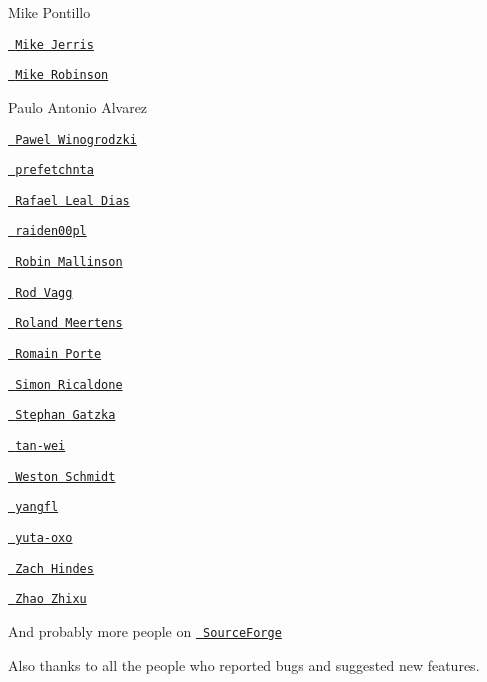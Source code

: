 \begin{DoxyItemize}
\item Mike Pontillo
\item \href{https://github.com/mjerris}{\texttt{ Mike Jerris}}
\item \href{https://github.com/mhrobinson}{\texttt{ Mike Robinson}}
\item Paulo Antonio Alvarez
\item \href{https://github.com/PawelWMS}{\texttt{ Pawel Winogrodzki}}
\item \href{https://github.com/prefetchnta}{\texttt{ prefetchnta}}
\item \href{https://github.com/rafaeldias}{\texttt{ Rafael Leal Dias}}
\item \href{https://github.com/raiden00pl}{\texttt{ raiden00pl}}
\item \href{https://github.com/rmallins}{\texttt{ Robin Mallinson}}
\item \href{https://github.com/rvagg}{\texttt{ Rod Vagg}}
\item \href{https://github.com/rmeertens}{\texttt{ Roland Meertens}}
\item \href{https://github.com/MicroJoe}{\texttt{ Romain Porte}}
\item \href{https://github.com/simon-p-r}{\texttt{ Simon Ricaldone}}
\item \href{https://github.com/gatzka}{\texttt{ Stephan Gatzka}}
\item \href{https://github.com/tan-wei}{\texttt{ tan-\/wei}}
\item \href{https://github.com/schmidtw}{\texttt{ Weston Schmidt}}
\item \href{https://github.com/yangfl}{\texttt{ yangfl}}
\item \href{https://github.com/yuta-oxo}{\texttt{ yuta-\/oxo}}
\item \href{https://github.com/zhindes}{\texttt{ Zach Hindes}}
\item \href{https://github.com/zhaozhixu}{\texttt{ Zhao Zhixu}}
\end{DoxyItemize}

And probably more people on \href{https://sourceforge.net/p/cjson/bugs/search/?q=status\%3Aclosed-rejected+or+status\%3Aclosed-out-of-date+or+status\%3Awont-fix+or+status\%3Aclosed-fixed+or+status\%3Aclosed&page=0}{\texttt{ Source\+Forge}}

Also thanks to all the people who reported bugs and suggested new features. 